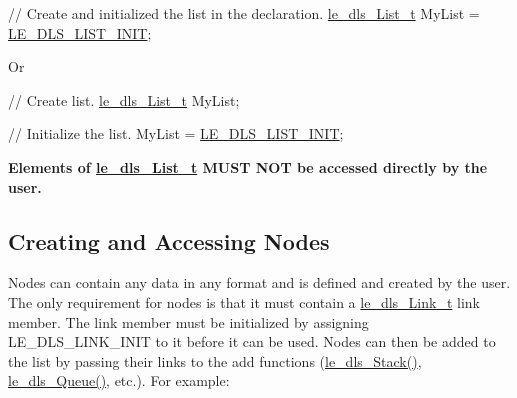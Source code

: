 \begin{DoxyCode}
\textcolor{comment}{// Create and initialized the list in the declaration.}
\hyperlink{structle__dls___list__t}{le\_dls\_List\_t} MyList = \hyperlink{le__doubly_linked_list_8h_a68f28b61cdfd004591f24730b4d5a740}{LE\_DLS\_LIST\_INIT};
\end{DoxyCode}


Or


\begin{DoxyCode}
\textcolor{comment}{// Create list.}
\hyperlink{structle__dls___list__t}{le\_dls\_List\_t} MyList;

\textcolor{comment}{// Initialize the list.}
MyList = \hyperlink{le__doubly_linked_list_8h_a68f28b61cdfd004591f24730b4d5a740}{LE\_DLS\_LIST\_INIT};
\end{DoxyCode}


{\bfseries  Elements of \hyperlink{structle__dls___list__t}{le\+\_\+dls\+\_\+\+List\+\_\+t} M\+U\+S\+T N\+O\+T be accessed directly by the user. }\hypertarget{c_doubly_linked_list_dls_createNode}{}\subsection{Creating and Accessing Nodes}\label{c_doubly_linked_list_dls_createNode}
Nodes can contain any data in any format and is defined and created by the user. The only requirement for nodes is that it must contain a {\ttfamily \hyperlink{structle__dls___link__t}{le\+\_\+dls\+\_\+\+Link\+\_\+t}} link member. The link member must be initialized by assigning L\+E\+\_\+\+D\+L\+S\+\_\+\+L\+I\+N\+K\+\_\+\+I\+N\+I\+T to it before it can be used. Nodes can then be added to the list by passing their links to the add functions (\hyperlink{le__doubly_linked_list_8h_a90f9072a55ef0cb573bbdad91e34d368}{le\+\_\+dls\+\_\+\+Stack()}, \hyperlink{le__doubly_linked_list_8h_a264df63b847a9c485df0bf9050ac5deb}{le\+\_\+dls\+\_\+\+Queue()}, etc.). For example\+:


